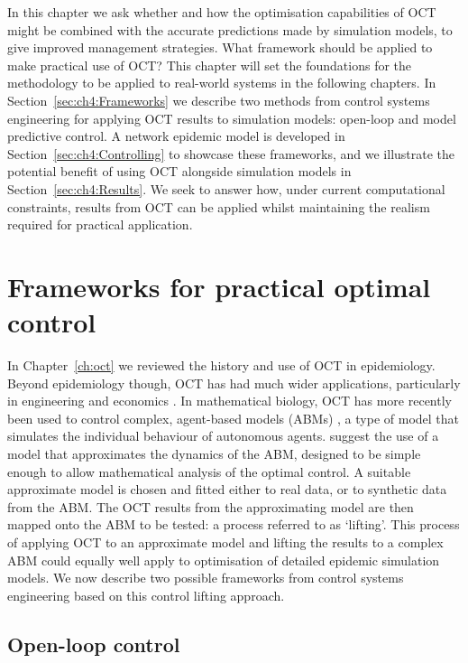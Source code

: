 In this chapter we ask whether and how the optimisation capabilities of OCT might be combined with the accurate predictions made by simulation models, to give improved management strategies. What framework should be applied to make practical use of OCT? This chapter will set the foundations for the methodology to be applied to real-world systems in the following chapters. In Section~\ref{sec:ch4:Frameworks} we describe two methods from control systems engineering for applying OCT results to simulation models: open-loop and model predictive control. A network epidemic model is developed in Section~\ref{sec:ch4:Controlling} to showcase these frameworks, and we illustrate the potential benefit of using OCT alongside simulation models in Section~\ref{sec:ch4:Results}. We seek to answer how, under current computational constraints, results from OCT can be applied whilst maintaining the realism required for practical application.

\section{Frameworks for practical optimal control\label{sec:ch4:Frameworks}}

In Chapter~\ref{ch:oct} we reviewed the history and use of OCT in epidemiology. Beyond epidemiology though, OCT has had much wider applications, particularly in engineering and economics \citep{bertsekas_dynamic_2001}. In mathematical biology, OCT has more recently been used to control complex, agent-based models (ABMs) \citep{an_optimization_2017}, a type of model that simulates the individual behaviour of autonomous agents. \citet{an_optimization_2017} suggest the use of a model that approximates the dynamics of the ABM, designed to be simple enough to allow mathematical analysis of the optimal control. A suitable approximate model is chosen and fitted either to real data, or to synthetic data from the ABM\@. The OCT results from the approximating model are then mapped onto the ABM to be tested: a process referred to as `lifting'. This process of applying OCT to an approximate model and lifting the results to a complex ABM could equally well apply to optimisation of detailed epidemic simulation models. We now describe two possible frameworks from control systems engineering based on this control lifting approach.

\subsection{Open-loop control}

